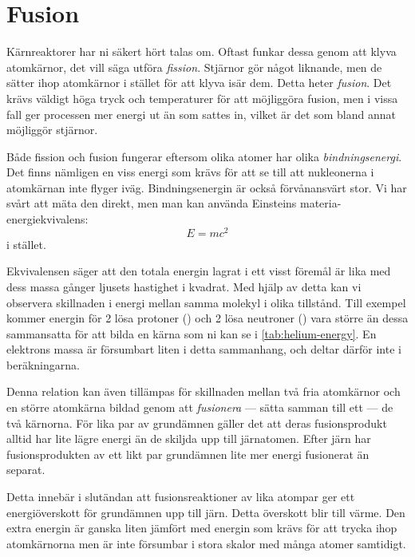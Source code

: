 \section{Fusion}
Kärnreaktorer har ni säkert hört talas om. Oftast funkar dessa genom att klyva atomkärnor, det vill säga utföra \emph{fission}. Stjärnor gör något liknande, men de sätter ihop atomkärnor i stället för att klyva isär dem. Detta heter \emph{fusion}. Det krävs väldigt höga tryck och temperaturer för att möjliggöra fusion, men i vissa fall ger processen mer energi ut än som sattes in, vilket är det som bland annat möjliggör stjärnor.

Både fission och fusion fungerar eftersom olika atomer har olika \emph{bindningsenergi}. Det finns nämligen en viss energi som krävs för att se till att nukleonerna i atomkärnan inte flyger iväg. Bindningsenergin är också förvånansvärt stor. Vi har svårt att mäta den direkt, men man kan använda Einsteins materia-energiekvivalens:
\begin{equation}
    E = mc^2
    \label{eq:emc2}
\end{equation}
i stället.

Ekvivalensen säger att den totala energin lagrat i ett visst föremål är lika med dess massa gånger ljusets hastighet i kvadrat. Med hjälp av detta kan vi observera skillnaden i energi mellan samma molekyl i olika tillstånd. Till exempel kommer energin för 2 lösa protoner () och 2 lösa neutroner () vara större än dessa sammansatta för att bilda en  kärna som ni kan se i \cref{tab:helium-energy}. En elektrons massa är försumbart liten i detta sammanhang, och deltar därför inte i beräkningarna.

Denna relation kan även tillämpas för skillnaden mellan två fria atomkärnor och en större atomkärna bildad genom att \emph{fusionera} --- sätta samman till ett --- de två kärnorna. För lika par av grundämnen gäller det att deras fusionsprodukt alltid har lite lägre energi än de skiljda upp till järnatomen. Efter järn har fusionsprodukten av ett likt par grundämnen lite mer energi fusionerat än separat.

Detta innebär i slutändan att fusionsreaktioner av lika atompar ger ett energiöverskott för grundämnen upp till järn. Detta överskott blir till värme. Den extra energin är ganska liten jämfört med energin som krävs för att trycka ihop atomkärnorna men är inte försumbar i stora skalor med många atomer samtidigt.

